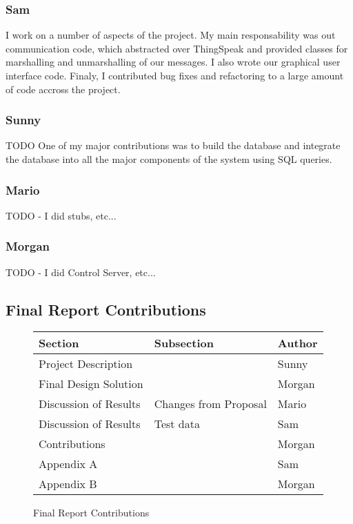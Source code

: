 \subsubsection{Sam}
I work on a number of aspects of the project. My main responsability was out
communication code, which abstracted over ThingSpeak and provided classes for
marshalling and unmarshalling of our messages. I also wrote our graphical user
interface code. Finaly, I contributed bug fixes and refactoring to a large
amount of code accross the project.

\subsubsection{Sunny}
TODO
One of my major contributions was to build the 
database and integrate the database into all 
the major components of the system using SQL queries.
\subsubsection{Mario}
TODO
- I did stubs, etc...
\subsubsection{Morgan}
TODO
- I did Control Server, etc...

\subsection{Final Report Contributions}

\begin{figure}[!htb]
\centering
\begin{tabular}{lll}
Section               & Subsection            & Author\\
\hline
Project Description   &                       & Sunny\\
Final Design Solution &                       & Morgan\\
Discussion of Results & Changes from Proposal & Mario\\
Discussion of Results & Test data             & Sam\\
Contributions         &                       & Morgan\\
Appendix A            &                       & Sam\\
Appendix B            &                       & Morgan\\
\end{tabular}
\caption{Final Report Contributions}
\label{fig:final-report-contributions}
\end{figure}
